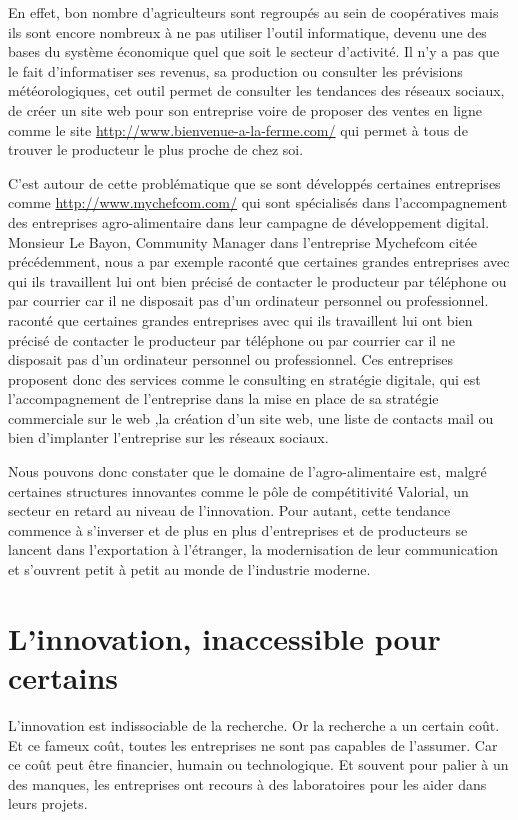 \documentclass[a4paper,10pt]{report}
\begin{document}
			En effet, bon nombre d’agriculteurs sont regroupés au sein de coopératives mais ils sont encore nombreux à ne pas utiliser l’outil informatique, devenu une des bases du système économique quel que soit le secteur d’activité\cite{FAIPeuInteresses}\cite{AdoptionTICAgricole}. Il n’y a pas que le fait d’informatiser ses revenus, sa production ou consulter les prévisions météorologiques, cet outil permet de consulter les tendances des réseaux sociaux, de créer un site web pour son entreprise voire de proposer des ventes en ligne comme le site \url{http://www.bienvenue-a-la-ferme.com/} qui permet à tous de trouver le producteur le plus proche de chez soi.
			
			C’est autour de cette problématique que se sont développés certaines entreprises comme \url{http://www.mychefcom.com/} qui sont spécialisés dans l’accompagnement des entreprises agro-alimentaire dans leur campagne de développement digital. Monsieur Le Bayon, Community Manager dans l’entreprise Mychefcom citée précédemment, nous a par exemple raconté que certaines grandes entreprises avec qui ils travaillent lui ont bien précisé de contacter le producteur par téléphone ou par courrier car il ne disposait pas d’un ordinateur personnel ou professionnel. raconté que certaines grandes entreprises avec qui ils travaillent lui ont bien précisé de contacter le producteur par téléphone ou par courrier car il ne disposait pas d’un ordinateur personnel ou professionnel. Ces entreprises proposent donc des services comme le consulting en stratégie digitale, qui est l’accompagnement de l’entreprise dans la mise en place de sa stratégie commerciale sur le web ,la création d’un site web, une liste de contacts mail ou bien d’implanter l’entreprise sur les réseaux sociaux.
			
			Nous pouvons donc constater que le domaine de l’agro-alimentaire est, malgré certaines structures innovantes comme le pôle de compétitivité Valorial, un secteur en retard au niveau de l’innovation. Pour autant, cette tendance commence à s’inverser et de plus en plus d’entreprises et de producteurs se lancent dans l’exportation à l’étranger, la modernisation de leur communication et s’ouvrent petit à petit au monde de l’industrie moderne.
			
	\section{L'innovation, inaccessible pour certains}
		L’innovation est indissociable de la recherche. Or la recherche a un certain coût. Et ce fameux coût, toutes les entreprises ne sont pas capables de l’assumer. Car ce coût peut être financier, humain ou technologique. Et souvent pour palier à un des manques, les entreprises ont recours à des laboratoires pour les aider dans leurs projets.
		
\end{document}
